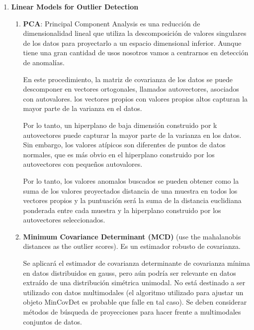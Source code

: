 \documentclass[12pt,twoside]{report}
\begin{document}
\begin{enumerate}
	\item \textbf{Linear Models for Outlier Detection}
	\begin{enumerate}
		\item \textbf{PCA}: Principal Component Analysis es una reducción de dimensionalidad lineal que utiliza la descomposición de valores singulares
     de los datos para proyectarlo a un espacio dimensional inferior. Aunque tiene una gran cantidad de usos nosotros vamos a centrarnos en detección de anomalías.

     En este procedimiento, la matriz de covarianza de los datos se puede descomponer en
     vectores ortogonales, llamados autovectores, asociados con autovalores. los
     vectores propios con valores propios altos capturan la mayor parte de la varianza en el
     datos.

     Por lo tanto, un hiperplano de baja dimensión construido por k autovectores puede
     capturar la mayor parte de la varianza en los datos. Sin embargo, los valores atípicos son diferentes
     de puntos de datos normales, que es más obvio en el hiperplano
     construido por los autovectores con pequeños autovalores.

     Por lo tanto, los valores anomalos buscados se pueden obtener como la suma de los valores proyectados
     distancia de una muestra en todos los vectores propios y la puntuación será la suma de la distancia euclidiana ponderada entre cada muestra y la
     hiperplano construido por los autovectores seleccionados.
		\item \textbf{Minimum Covariance Determinant (MCD)} (use the mahalanobis distances as the outlier scores). Es un estimador robusto de covarianza.

     Se aplicará el estimador de covarianza determinante de covarianza mínima
     en datos distribuidos en gauss, pero aún podría ser relevante en datos
     extraído de una distribución simétrica unimodal. No está destinado a ser utilizado
     con datos multimodales (el algoritmo utilizado para ajustar un objeto MinCovDet es
     probable que falle en tal caso).
     Se deben considerar métodos de búsqueda de proyecciones para hacer frente a multimodales
     conjuntos de datos.


\end{enumerate}
\end{enumerate}
\end{document}

